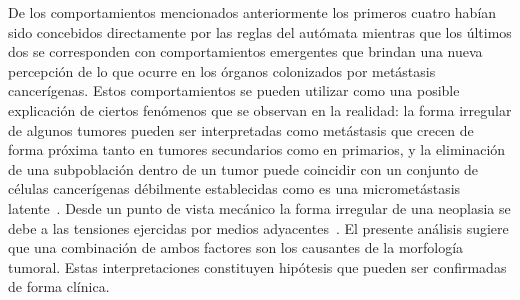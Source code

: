 De los comportamientos mencionados anteriormente los primeros cuatro hab\'ian sido concebidos directamente por las reglas del aut\'omata mientras que los \'ultimos dos se corresponden con comportamientos emergentes que brindan una nueva percepci\'on de lo que ocurre en los \'organos colonizados por met\'astasis cancer\'igenas. Estos comportamientos se pueden utilizar como una posible explicaci\'on de ciertos fen\'omenos que se observan en la realidad: la forma irregular de algunos tumores pueden ser interpretadas como met\'astasis que crecen de forma pr\'oxima tanto en tumores secundarios como en primarios, y la eliminaci\'on de una subpoblaci\'on dentro de un tumor puede coincidir con un conjunto de c\'elulas cancer\'igenas d\'ebilmente establecidas como es una micromet\'astasis latente~\cite{robins}. Desde un punto de vista mec\'anico la forma irregular de una neoplasia se debe a las tensiones ejercidas por medios adyacentes~\cite{ariel,ruben,helmlinger}. El presente an\'alisis sugiere que una combinaci\'on de ambos factores son los causantes de la morfolog\'ia tumoral. Estas interpretaciones constituyen hip\'otesis que pueden ser confirmadas de forma cl\'inica.

